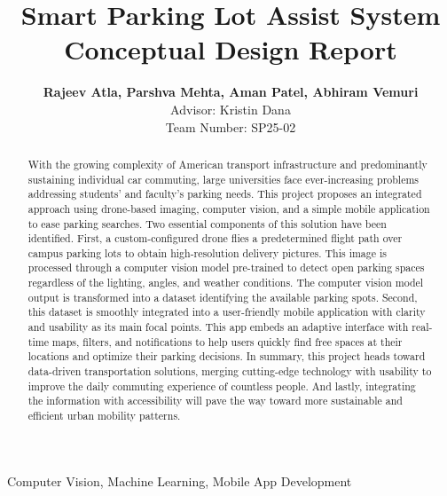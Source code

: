 \documentclass[conference]{IEEEtran}
\begin{document}
\title{Smart Parking Lot Assist System\\
{\footnotesize \textbf{Conceptual Design Report}}
}

\author{
\textbf{Rajeev Atla, Parshva Mehta, Aman Patel, Abhiram Vemuri} \\
Advisor: Kristin Dana\\
Team Number: SP25-02 
}

\maketitle

\begin{abstract}
    With the growing complexity of American transport infrastructure and predominantly sustaining individual car commuting, large universities face ever-increasing problems addressing students’ and faculty’s parking needs. 
    This project proposes an integrated approach using drone-based imaging, 
    computer vision, 
    and a simple mobile application to ease parking searches. 
    Two essential components of this solution have been identified. 
    First, 
    a custom-configured drone flies a predetermined flight path over campus parking lots to obtain high-resolution delivery pictures. 
    This image is processed through a computer vision model pre-trained to detect open parking spaces regardless of the lighting, 
    angles, 
    and weather conditions. 
    The computer vision model output is transformed into a dataset identifying the available parking spots. 
    Second, 
    this dataset is smoothly integrated into a user-friendly mobile application with clarity and usability as its main focal points. 
    This app embeds an adaptive interface with real-time maps, 
    filters, 
    and notifications to help users quickly find free spaces at their locations and optimize their parking decisions. 
    In summary, 
    this project heads toward data-driven transportation solutions, 
    merging cutting-edge technology with usability to improve the daily commuting experience of countless people. 
    And lastly, 
    integrating the information with accessibility will pave the way toward more sustainable and efficient urban mobility patterns.
\end{abstract}

\begin{IEEEkeywords}
Computer Vision, Machine Learning, Mobile App Development
\end{IEEEkeywords}
\end{document}
